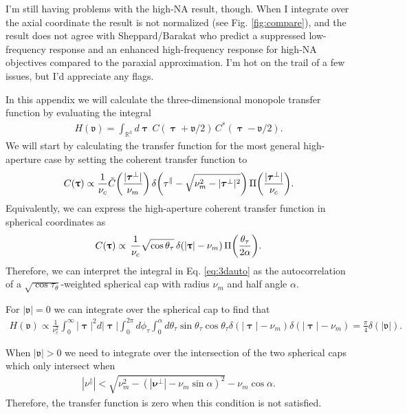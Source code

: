 \documentclass[]{osa-article}
\let\originalleft\left
\let\originalright\right
\renewcommand{\left}{\mathopen{}\mathclose\bgroup\originalleft}
\renewcommand{\right}{\aftergroup\egroup\originalright}
\newcommand{\mypar}{\parallel}
\providecommand{\mbb}[1]{\mathbb{#1}}
\providecommand{\bs}[1]{\boldsymbol{#1}}
\providecommand{\bv}{\boldsymbol{\mathfrak{v}}}
\providecommand{\bvperp}{\bs{\nu}^{\bot}}
\providecommand{\bvpar}{\nu^{\parallel}}
\providecommand{\bt}{\bs{\uptau}}
\providecommand{\btperp}{\bs{\tau}^{\bot}}
\providecommand{\btpar}{\tau^{\mypar}}
\providecommand{\add}[1]{{\color{blue}#1}}
\begin{document}
\add{I'm still having problems with the high-NA result, though. When I integrate over the axial coordinate the result is not normalized (see Fig. \ref{fig:compare}), and the result does not agree with Sheppard/Barakat \cite{barakat1963, sheppard1994} who predict a suppressed low-frequency response and an enhanced high-frequency response for high-NA objectives compared to the paraxial approximation. I'm hot on the trail of a few issues, but I'd appreciate any flags.}

In this appendix we will calculate the three-dimensional monopole transfer function
by evaluating the integral
\begin{align}
  H(\bv) = \int_{\mbb{R}^3}d\bt\, C(\bt + \bv/2)\,C^*(\bt - \bv/2). \label{eq:3dauto}
\end{align}
We will start by calculating the transfer function for the most general high-aperture case by setting the coherent transfer function to
\begin{align}
  C(\bt) \propto \frac{1}{\nu_c}\tilde{C}\left(\frac{|\btperp|}{\nu_m}\right)\,\delta\left(\btpar - \sqrt{\nu_m^2 - |\btperp|^2}\right)\,\Pi\left(\frac{|\btperp|}{\nu_c}\right).
\end{align}
Equivalently, we can express the high-aperture coherent transfer function in spherical coordinates as
\begin{align}
  C(\bt) \propto \,\frac{1}{\nu_c}\sqrt{\cos\theta_{\tau}}\,\delta\left(|\bt| - \nu_m\right)\,\Pi\left(\frac{\theta_{\tau}}{2\alpha}\right).
\end{align}
Therefore, we can interpret the integral in Eq. \eqref{eq:3dauto} as the autocorrelation of a $\sqrt{\cos\tau_\theta}$-weighted spherical cap with radius $\nu_m$ and half angle $\alpha$.

For $|\bv| = 0$ we can integrate over the spherical cap to find that 
\begin{align}
  H(\bv) \propto \frac{1}{\nu_c^2}\int_{0}^{\infty}|\bt|^2d|\bt|\int_0^{2\pi}d\phi_\tau\int_{0}^{\alpha}d\theta_\tau \sin\theta_\tau\cos\theta_\tau\delta(|\bt| - \nu_m)\delta(|\bt| - \nu_m) = \frac{\pi}{4}\delta(|\bv|).
\end{align}

When $|\bv| > 0$ we need to integrate over the intersection of the two spherical
caps which only intersect when
\begin{align}
  |\bvpar| < \sqrt{\nu_m^2 - (|\bvperp| - \nu_m\sin\alpha)^2} - \nu_m\cos\alpha. 
\end{align}
Therefore, the transfer function is zero when this condition is not satisfied.
\end{document}
